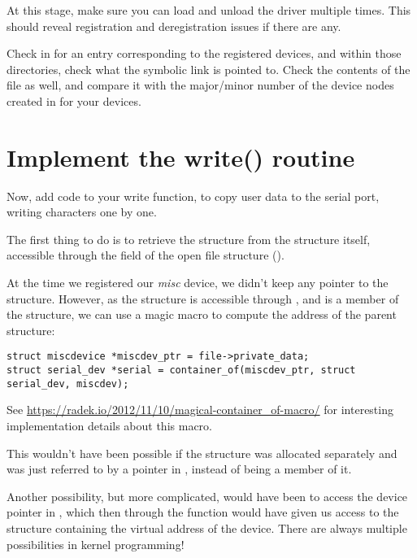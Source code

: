 At this stage, make sure you can load and unload the driver multiple
times. This should reveal registration and deregistration issues if
there are any.

Check in  for an entry corresponding to the
registered devices, and within those directories, check what the
 symbolic link is pointed to. Check the contents of the
 file as well, and compare it with the major/minor number of
the device nodes created in  for your devices.

\section{Implement the write() routine}

Now, add code to your write function, to copy user data to the serial
port, writing characters one by one.

The first thing to do is to retrieve the  structure
from the  structure itself, accessible through the
 field of the open file structure ().

At the time we registered our {\em misc} device, we didn't keep any
pointer to the  structure. However, as the
 structure is accessible through
, and is a member of the
 structure, we can use a magic macro to compute
the address of the parent structure:

\begin{verbatim}
struct miscdevice *miscdev_ptr = file->private_data;
struct serial_dev *serial = container_of(miscdev_ptr, struct serial_dev, miscdev);
\end{verbatim}

See \url{https://radek.io/2012/11/10/magical-container_of-macro/}
for interesting implementation details about this macro.

This wouldn't have been possible if the  structure
was allocated separately and was just referred to by a pointer in
, instead of being a member of it.

Another possibility, but more complicated, would have been to access the
 device pointer in , which then through
the  function would
have given us access to the  structure containing the
virtual address of the device. There are always multiple possibilities
in kernel programming!

